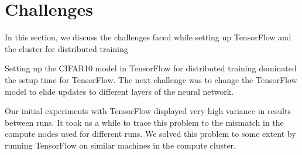 \section{Challenges}

In this section, we discuss the challenges faced while setting
up TensorFlow and the cluster for distributed training

Setting up the CIFAR10 model in TensorFlow for distributed training
dominated the setup time for TensorFlow. The next challenge was to 
change the TensorFlow model to elide updates to different layers
of the neural network. 

Our initial experiments with TensorFlow displayed very high variance
in results between runs. It took us a while to trace this problem
to the mismatch in the compute nodes used for different runs. We solved
this problem to some extent by running TensorFlow on similar machines
in the compute cluster.


